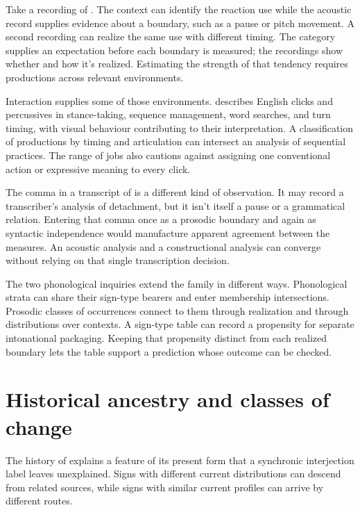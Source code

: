 \documentclass[12pt]{article}
\begin{document}
Take a recording of . The
context can identify the reaction use while the acoustic record supplies
evidence about a boundary, such as a pause or pitch movement. A
second recording can realize the same use with different timing.
The category supplies an expectation before each boundary is measured;
the recordings show whether and how it's realized. Estimating the
strength of that tendency requires productions across relevant environments.

Interaction supplies some of those environments. \textcite{ogden2013clicks} describes English
clicks and percussives in stance-taking, sequence management, word searches,
and turn timing, with visual behaviour contributing to their interpretation. A classification of productions by timing and
articulation can intersect an analysis of sequential practices.
The range of jobs also cautions against assigning one conventional action
or expressive meaning to every click.

The comma in a transcript of 
is a different kind of observation. It may record a transcriber's
analysis of detachment, but it isn't itself a pause or a grammatical
relation. Entering that comma once as a prosodic boundary and again
as syntactic independence would manufacture apparent agreement between
the measures. An acoustic analysis and a constructional analysis can
converge without relying on that single transcription decision.

The two phonological inquiries extend the family in different ways. Phonological strata can share their sign-type bearers and
enter membership intersections. Prosodic classes of occurrences connect
to them through realization and through distributions over contexts.
A sign-type table can record a propensity for separate intonational
packaging. Keeping that propensity distinct from each realized boundary
lets the table support a prediction whose outcome can be checked.

\section{Historical ancestry and classes of change}\label{sec:history}

The history of  explains a feature of its present form
that a synchronic interjection label leaves unexplained. Signs with
different current distributions can descend from related sources, while
signs with similar current profiles can arrive by different routes.
\end{document}
